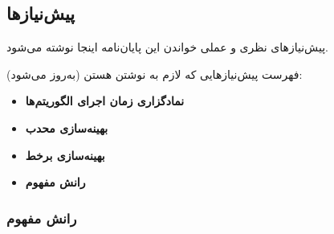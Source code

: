 \subsection{
پیش‌نیازها
}

پیش‌نیازهای نظری و عملی خواندن این پایان‌نامه اینجا نوشته می‌شود.


فهرست پیش‌نیازهایی که لازم به نوشتن هستن (به‌روز می‌شود):
\begin{itemize}
\item {\bf
نمادگزاری زمان اجرای الگوریتم‌ها
}


\item {\bf
بهینه‌سازی محدب
}

\item {\bf
بهینه‌سازی برخط
}

\item {\bf
رانش مفهوم
}

\end{itemize}



















\subsubsection{
رانش مفهوم
}






























